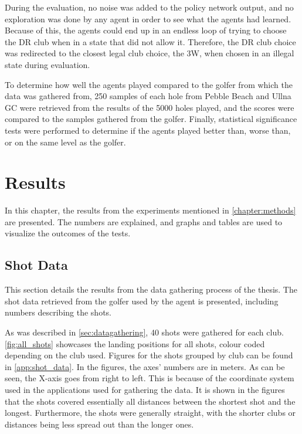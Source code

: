 \documentclass{kththesis}
\begin{document}
During the evaluation, no noise was added to the policy network output, and no exploration was done by any agent in order to see what the agents had learned. Because of this, the agents could end up in an endless loop of trying to choose the DR club when in a state that did not allow it. Therefore, the DR club choice was redirected to the closest legal club choice, the 3W, when chosen in an illegal state during evaluation.

To determine how well the agents played compared to the golfer from which the data was gathered from, 250 samples of each hole from Pebble Beach and Ullna GC were retrieved from the results of the 5000 holes played, and the scores were compared to the samples gathered from the golfer. Finally, statistical significance tests were performed to determine if the agents played better than, worse than, or on the same level as the golfer.

\chapter{Results}
\label{chapter:results}
In this chapter, the results from the experiments mentioned in \autoref{chapter:methods} are presented. The numbers are explained, and graphs and tables are used to visualize the outcomes of the tests.

\section{Shot Data}
This section details the results from the data gathering process of the thesis. The shot data retrieved from the golfer used by the agent is presented, including numbers describing the shots.

As was described in \autoref{sec:datagathering}, 40 shots were gathered for each club. \autoref{fig:all_shots} showcases the landing positions for all shots, colour coded depending on the club used. Figures for the shots grouped by club can be found in \autoref{app:shot_data}. In the figures, the axes' numbers are in meters. As can be seen, the X-axis goes from right to left. This is because of the coordinate system used in the applications used for gathering the data. It is shown in the figures that the shots covered essentially all distances between the shortest shot and the longest. Furthermore, the shots were generally straight, with the shorter clubs or distances being less spread out than the longer ones.
\end{document}
